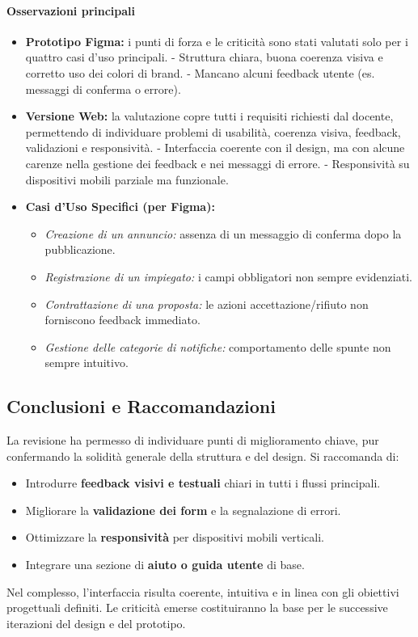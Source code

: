 \paragraph{Osservazioni principali}
\begin{itemize}
    \item \textbf{Prototipo Figma:} i punti di forza e le criticità sono stati valutati solo per i quattro casi d’uso principali.  
        - Struttura chiara, buona coerenza visiva e corretto uso dei colori di brand.  
        - Mancano alcuni feedback utente (es. messaggi di conferma o errore).
    \item \textbf{Versione Web:} la valutazione copre tutti i requisiti richiesti dal docente, permettendo di individuare problemi di usabilità, coerenza visiva, feedback, validazioni e responsività.  
        - Interfaccia coerente con il design, ma con alcune carenze nella gestione dei feedback e nei messaggi di errore.  
        - Responsività su dispositivi mobili parziale ma funzionale.
    \item \textbf{Casi d’Uso Specifici (per Figma):} 
        \begin{itemize}
            \item \textit{Creazione di un annuncio:} assenza di un messaggio di conferma dopo la pubblicazione.  
            \item \textit{Registrazione di un impiegato:} i campi obbligatori non sempre evidenziati.  
            \item \textit{Contrattazione di una proposta:} le azioni accettazione/rifiuto non forniscono feedback immediato.  
            \item \textit{Gestione delle categorie di notifiche:} comportamento delle spunte non sempre intuitivo.
        \end{itemize}
\end{itemize}

\subsection*{Conclusioni e Raccomandazioni}

La revisione ha permesso di individuare punti di miglioramento chiave, pur confermando la solidità generale della struttura e del design.  
Si raccomanda di:
\begin{itemize}
    \item Introdurre \textbf{feedback visivi e testuali} chiari in tutti i flussi principali.
    \item Migliorare la \textbf{validazione dei form} e la segnalazione di errori.
    \item Ottimizzare la \textbf{responsività} per dispositivi mobili verticali.
    \item Integrare una sezione di \textbf{aiuto o guida utente} di base.
\end{itemize}

Nel complesso, l’interfaccia risulta coerente, intuitiva e in linea con gli obiettivi progettuali definiti.  
Le criticità emerse costituiranno la base per le successive iterazioni del design e del prototipo.
